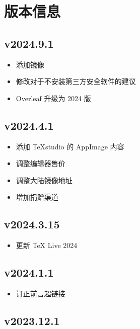 
\chapter{版本信息}

\section*{v2024.9.1}

\begin{itemize}
  \item 添加镜像
  \item 修改对于不安装第三方安全软件的建议
  \item Overleaf 升级为 2024 版
\end{itemize}

\section*{v2024.4.1}

\begin{itemize}
  \item 添加 \TeX studio 的 AppImage 内容
  \item 调整编辑器售价
  \item 调整大陆镜像地址
  \item 增加捐赠渠道
\end{itemize}

\section*{v2024.3.15}

\begin{itemize}
  \item 更新 \TeX{} Live 2024
\end{itemize}

\section*{v2024.1.1}

\begin{itemize}
  \item 订正前言超链接
\end{itemize}

\section*{v2023.12.1}

